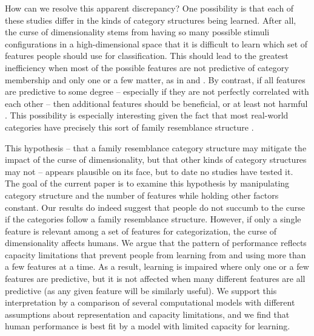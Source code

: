 \documentclass[a4paper, doc, floatsintext]{apa6}
\begin{document}
How can we resolve this apparent discrepancy? One possibility is that each of these studies differ in the kinds of category structures being learned. After all, the curse of dimensionality stems from having so many possible stimuli configurations in a high-dimensional space that it is difficult to learn which set of features people should use for classification. This should lead to the greatest inefficiency when most of the possible features are not predictive of category membership and only one or a few matter, as in  and . By contrast, if all features are predictive to some degree -- especially if they are not perfectly correlated with each other -- then additional features should be beneficial, or at least not harmful  \cite{hoffman2006category,hoffman2008prior,minda2001prototypes}. This possibility is especially interesting given the fact that most real-world categories have precisely this sort of family resemblance structure \cite{roschmervis75,murphy02}.

This hypothesis -- that a family resemblance category structure may mitigate the impact of the curse of dimensionality, but that other kinds of category structures may not -- appears plausible on its face, but to date no studies have tested it. The goal of the current paper is to examine this hypothesis by manipulating category structure and the number of features while holding other factors constant. Our results do indeed suggest that people do not succumb to the curse if the categories follow a family resemblance structure. However, if only a single feature is relevant among a set of features for categorization, the curse of dimensionality affects humans. We argue that the pattern of performance reflects capacity limitations that prevent people from learning from and using more than a few features at a time. As a result, learning is impaired where only one or a few features are predictive, but it is not affected when many different features are all predictive (as any given feature will be similarly useful). We support this interpretation by a comparison of several computational models with different assumptions about representation and capacity limitations, and we find that human performance is best fit by a model with limited capacity for learning.

\end{document}
